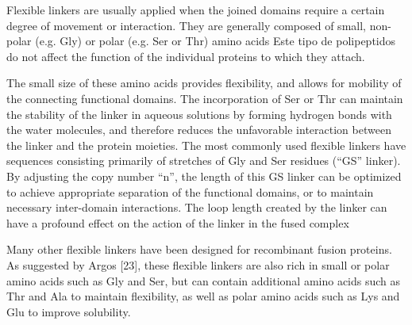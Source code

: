 

Flexible linkers are usually applied when the joined domains require a certain degree of movement or interaction. They are generally composed of small, non-polar (e.g. Gly) or polar (e.g. Ser or Thr) amino acids
Este tipo de polipeptidos do not affect the function of the individual proteins to which they attach. 

The small size of these amino acids provides flexibility, and allows for mobility of the connecting functional domains. 
The incorporation of Ser or Thr can maintain the stability of the linker in aqueous solutions by forming hydrogen bonds with the water molecules, and therefore reduces the unfavorable interaction between the linker and the protein moieties.
The most commonly used flexible linkers have sequences consisting primarily of stretches of Gly and Ser residues (“GS” linker). 
By adjusting the copy number “n”, the length of this GS linker can be optimized to achieve appropriate separation of the functional domains, or to maintain necessary inter-domain interactions.
The loop length created by the linker can have a profound effect on the action of the linker in the fused complex

Many other flexible linkers have been designed for recombinant fusion proteins. As suggested by Argos [23], these flexible linkers are also rich in small or polar amino acids such as Gly and Ser, but can contain additional amino acids such as Thr and Ala to maintain flexibility, as
well as polar amino acids such as Lys and Glu to improve solubility.



